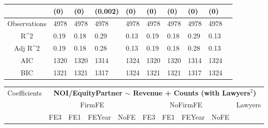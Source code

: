 \documentclass{article}
\begin{document}
\begin{table}[H]
\begin{tabular}{|clllllllll|}
   & (0) & (0) & (0.002) & (0) & (0) & (0) & (0) & (0) & \\ 
  \hline 
 Observations & 4978 & 4978 & 4978 & 4978 & 4978 & 4978 & 4978 & 4978 & \\ 
  R^2 & 0.19 & 0.18 & 0.29 & 0.13 & 0.19 & 0.18 & 0.29 & 0.13 & \\ 
  Adj R^2 & 0.19 & 0.18 & 0.28 & 0.13 & 0.19 & 0.18 & 0.28 & 0.13 & \\ 
  AIC & 1320 & 1320 & 1314 & 1324 & 1320 & 1320 & 1314 & 1324 & \\ 
  BIC & 1321 & 1321 & 1317 & 1324 & 1321 & 1321 & 1317 & 1324 & \\ 
   \hline
\end{tabular}
 
\end{table}


\begin{table}[H]
\centering
\begin{tabular}{|clllllllll|}
\hline
\multirow{3}{*}{Coefficients} & \multicolumn{9}{c|}{\textbf{NOI/EquityPartner $\sim$ Revenue + Counts (with Lawyers$^2$)}} \\
\cline{2-10}
& \multicolumn{4}{c}{FirmFE} & \multicolumn{4}{c}{NoFirmFE} & \multirow{2}{*}{Lawyers} \\
\cline{2-9}
& FE3 & FE1 & FEYear & NoFE & FE3 & FE1 & FEYear & NoFE &  \\
\hline
 

\end{tabular}
\end{table}
\end{document}
